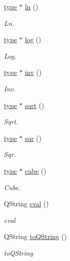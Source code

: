 \begin{DoxyCompactItemize}
\hyperlink{classtype}{type} $\ast$ \hyperlink{class_expression_a1f6cd71d574995f2c3e80c3033ca2940}{ln} ()
\begin{DoxyCompactList}\small\item\em Ln. \end{DoxyCompactList}\item 
\hyperlink{classtype}{type} $\ast$ \hyperlink{class_expression_a9eb28aee26ef54093fc83f89ef3c1523}{log} ()
\begin{DoxyCompactList}\small\item\em Log. \end{DoxyCompactList}\item 
\hyperlink{classtype}{type} $\ast$ \hyperlink{class_expression_ab3dc93b84bb845663383b4347550c9d5}{inv} ()
\begin{DoxyCompactList}\small\item\em Inv. \end{DoxyCompactList}\item 
\hyperlink{classtype}{type} $\ast$ \hyperlink{class_expression_ac5b9d54cc3699ccec579001a9e954bd3}{sqrt} ()
\begin{DoxyCompactList}\small\item\em Sqrt. \end{DoxyCompactList}\item 
\hyperlink{classtype}{type} $\ast$ \hyperlink{class_expression_a172e59bd44c5ddf668fd8027f0733d8d}{sqr} ()
\begin{DoxyCompactList}\small\item\em Sqr. \end{DoxyCompactList}\item 
\hyperlink{classtype}{type} $\ast$ \hyperlink{class_expression_afaa9e88c0eedebcd346859b7593f5b48}{cube} ()
\begin{DoxyCompactList}\small\item\em Cube. \end{DoxyCompactList}\item 
Q\-String \hyperlink{class_expression_a7312cb958b6366f84fb4e01f58cd2119}{eval} ()
\begin{DoxyCompactList}\small\item\em eval \end{DoxyCompactList}\item 
Q\-String \hyperlink{class_expression_a4404792ff4997e7c06a3242062825f5c}{to\-Q\-String} ()
\begin{DoxyCompactList}\small\item\em to\-Q\-String \end{DoxyCompactList}\end{DoxyCompactItemize}
